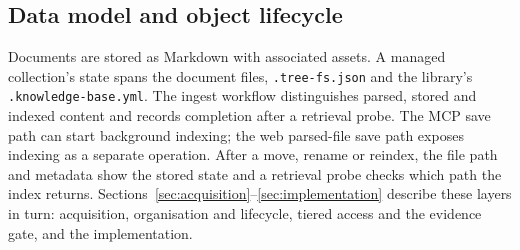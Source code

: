 \subsection{Data model and object lifecycle}
\label{sec:datamodel}
\label{sec:lifecycle}

Documents are stored as Markdown with associated assets. A managed
collection's state spans the document files, \texttt{.tree-fs.json} and the
library's \texttt{.knowledge-base.yml}. The ingest workflow distinguishes
parsed, stored and indexed content and records completion after a retrieval
probe. The MCP save path can start background indexing; the web parsed-file
save path exposes indexing as a separate operation. After a move, rename
or reindex, the file path and metadata show the stored state and a
retrieval probe checks which path the index returns.
Sections~\ref{sec:acquisition}--\ref{sec:implementation} describe these
layers in turn: acquisition, organisation and lifecycle, tiered access
and the evidence gate, and the implementation.
